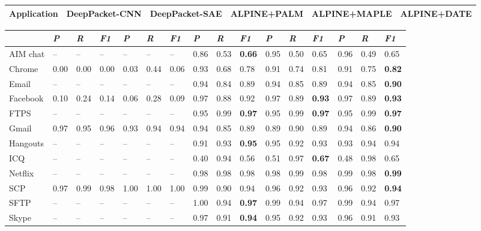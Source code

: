 \begin{table} [ht!]
\centering
\begin{tabular} {|p{2cm}|p{2.3cm}|p{2.4cm}|p{2.3cm}|p{2.4cm}|p{2.3cm}|}
\hline
\textbf{Application} & DeepPacket-CNN & DeepPacket-SAE & ALPINE+PALM & ALPINE+MAPLE & ALPINE+DATE \\
\hline
\end{tabular}
\begin{tabular} {|p{2cm}|p{0.5cm}p{0.5cm}p{0.5cm}|p{0.5cm}p{0.5cm}p{0.5cm}|p{0.5cm}p{0.5cm}p{0.5cm}|p{0.5cm}p{0.5cm}p{0.5cm}|p{0.5cm}p{0.5cm}p{0.5cm}|}
\hline
& \textit{P} & \textit{R} & \textit{F1} & \textit{P} & \textit{R} & \textit{F1} & \textit{P} & \textit{R} & %
\textit{F1} & \textit{P} & \textit{R} & \textit{F1} & \textit{P} & \textit{R} & \textit{F1} \\
\hline
AIM chat & -- & -- & -- & -- & -- & -- & 0.86 & 0.53 & \textbf{0.66} & 0.95 & 0.50 & 0.65 & 0.96 & 0.49 & 0.65 \\
Chrome & 0.00 & 0.00 & 0.00 & 0.03 & 0.44 & 0.06 & 0.93 & 0.68 & 0.78 & 0.91 & 0.74 & 0.81 & 0.91 & 0.75 & \textbf{0.82}\\
Email & -- & -- & -- & -- & -- & -- & 0.94 & 0.84 & 0.89 & 0.94 & 0.85 & 0.89 & 0.94 & 0.85 & \textbf{0.90} \\
Facebook & 0.10 & 0.24 & 0.14 & 0.06 & 0.28 & 0.09 & 0.97 & 0.88 & 0.92 & 0.97 & 0.89 & \textbf{0.93} & 0.97 & 0.89 & \textbf{0.93} \\
FTPS & -- & -- & -- & -- & -- & -- & 0.95 & 0.99 & \textbf{0.97} & 0.95 & 0.99 & \textbf{0.97} & 0.95 & 0.99 & \textbf{0.97} \\
Gmail & 0.97 & 0.95 & 0.96 & 0.93 & 0.94 & 0.94 & 0.94 & 0.85 & 0.89 & 0.89 & 0.90 & 0.89 & 0.94 & 0.86 & \textbf{0.90} \\
Hangouts & -- & -- & -- & -- & -- & -- & 0.91 & 0.93 & \textbf{0.95} & 0.95 & 0.92 & 0.93 & 0.93 & 0.94 & 0.94 \\
ICQ & -- & -- & -- & -- & -- & -- & 0.40 & 0.94 & 0.56 & 0.51 & 0.97 & \textbf{0.67} & 0.48 & 0.98 & 0.65 \\
Netflix & -- & -- & -- & -- & -- & -- & 0.98 & 0.98 & 0.98 & 0.98 & 0.99 & 0.98 & 0.99 & 0.98 & \textbf{0.99} \\
SCP & 0.97 & 0.99 & 0.98 & 1.00 & 1.00 & 1.00 & 0.99 & 0.90 & 0.94 & 0.96 & 0.92 & 0.93 & 0.96 & 0.92 & \textbf{0.94} \\
SFTP & -- & -- & -- & -- & -- & -- & 1.00 & 0.94 & \textbf{0.97} & 0.99 & 0.94 & 0.97 & 0.99 & 0.94 & 0.97 \\
Skype & -- & -- & -- & -- & -- & -- & 0.97 & 0.91 & \textbf{0.94} & 0.95 & 0.92 & 0.93 & 0.96 & 0.91 & 0.93 \\

\end{tabular}
\end{table}
